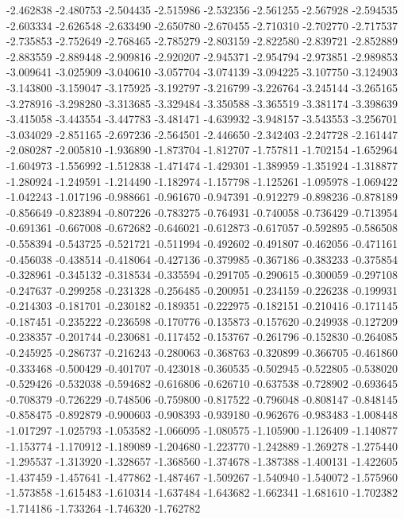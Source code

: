 -2.462838
-2.480753
-2.504435
-2.515986
-2.532356
-2.561255
-2.567928
-2.594535
-2.603334
-2.626548
-2.633490
-2.650780
-2.670455
-2.710310
-2.702770
-2.717537
-2.735853
-2.752649
-2.768465
-2.785279
-2.803159
-2.822580
-2.839721
-2.852889
-2.883559
-2.889448
-2.909816
-2.920207
-2.945371
-2.954794
-2.973851
-2.989853
-3.009641
-3.025909
-3.040610
-3.057704
-3.074139
-3.094225
-3.107750
-3.124903
-3.143800
-3.159047
-3.175925
-3.192797
-3.216799
-3.226764
-3.245144
-3.265165
-3.278916
-3.298280
-3.313685
-3.329484
-3.350588
-3.365519
-3.381174
-3.398639
-3.415058
-3.443554
-3.447783
-3.481471
-4.639932
-3.948157
-3.543553
-3.256701
-3.034029
-2.851165
-2.697236
-2.564501
-2.446650
-2.342403
-2.247728
-2.161447
-2.080287
-2.005810
-1.936890
-1.873704
-1.812707
-1.757811
-1.702154
-1.652964
-1.604973
-1.556992
-1.512838
-1.471474
-1.429301
-1.389959
-1.351924
-1.318877
-1.280924
-1.249591
-1.214490
-1.182974
-1.157798
-1.125261
-1.095978
-1.069422
-1.042243
-1.017196
-0.988661
-0.961670
-0.947391
-0.912279
-0.898236
-0.878189
-0.856649
-0.823894
-0.807226
-0.783275
-0.764931
-0.740058
-0.736429
-0.713954
-0.691361
-0.667008
-0.672682
-0.646021
-0.612873
-0.617057
-0.592895
-0.586508
-0.558394
-0.543725
-0.521721
-0.511994
-0.492602
-0.491807
-0.462056
-0.471161
-0.456038
-0.438514
-0.418064
-0.427136
-0.379985
-0.367186
-0.383233
-0.375854
-0.328961
-0.345132
-0.318534
-0.335594
-0.291705
-0.290615
-0.300059
-0.297108
-0.247637
-0.299258
-0.231328
-0.256485
-0.200951
-0.234159
-0.226238
-0.199931
-0.214303
-0.181701
-0.230182
-0.189351
-0.222975
-0.182151
-0.210416
-0.171145
-0.187451
-0.235222
-0.236598
-0.170776
-0.135873
-0.157620
-0.249938
-0.127209
-0.238357
-0.201744
-0.230681
-0.117452
-0.153767
-0.261796
-0.152830
-0.264085
-0.245925
-0.286737
-0.216243
-0.280063
-0.368763
-0.320899
-0.366705
-0.461860
-0.333468
-0.500429
-0.401707
-0.423018
-0.360535
-0.502945
-0.522805
-0.538020
-0.529426
-0.532038
-0.594682
-0.616806
-0.626710
-0.637538
-0.728902
-0.693645
-0.708379
-0.726229
-0.748506
-0.759800
-0.817522
-0.796048
-0.808147
-0.848145
-0.858475
-0.892879
-0.900603
-0.908393
-0.939180
-0.962676
-0.983483
-1.008448
-1.017297
-1.025793
-1.053582
-1.066095
-1.080575
-1.105900
-1.126409
-1.140877
-1.153774
-1.170912
-1.189089
-1.204680
-1.223770
-1.242889
-1.269278
-1.275440
-1.295537
-1.313920
-1.328657
-1.368560
-1.374678
-1.387388
-1.400131
-1.422605
-1.437459
-1.457641
-1.477862
-1.487467
-1.509267
-1.540940
-1.540072
-1.575960
-1.573858
-1.615483
-1.610314
-1.637484
-1.643682
-1.662341
-1.681610
-1.702382
-1.714186
-1.733264
-1.746320
-1.762782
